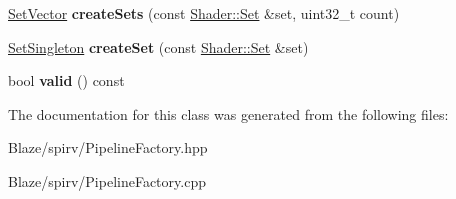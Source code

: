 \begin{DoxyCompactItemize}
\item 
\mbox{\label{classblaze_1_1spirv_1_1PipelineFactory_ab7e18c33bc6970c3a766165a52b0d564}} 
\hyperlink{structblaze_1_1spirv_1_1SetVector}{Set\+Vector} {\bfseries create\+Sets} (const \hyperlink{structblaze_1_1spirv_1_1Shader_1_1Set}{Shader\+::\+Set} \&set, uint32\+\_\+t count)
\item 
\mbox{\label{classblaze_1_1spirv_1_1PipelineFactory_ab2a6b51346548c45e1f6b967d7322f37}} 
\hyperlink{structblaze_1_1spirv_1_1SetSingleton}{Set\+Singleton} {\bfseries create\+Set} (const \hyperlink{structblaze_1_1spirv_1_1Shader_1_1Set}{Shader\+::\+Set} \&set)
\item 
\mbox{\label{classblaze_1_1spirv_1_1PipelineFactory_a24dd894f334060f3703f81928c466e8b}} 
bool {\bfseries valid} () const
\end{DoxyCompactItemize}


The documentation for this class was generated from the following files\+:\begin{DoxyCompactItemize}
\item 
Blaze/spirv/Pipeline\+Factory.\+hpp\item 
Blaze/spirv/Pipeline\+Factory.\+cpp\end{DoxyCompactItemize}
